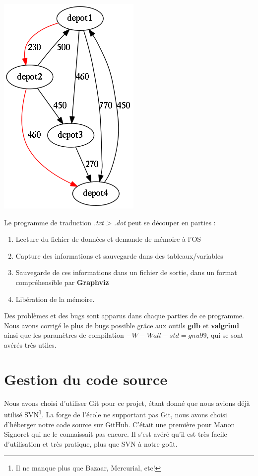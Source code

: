 \documentclass[12pt,a4paper]{report}
\begin{document}
\begin{center}
\includegraphics[scale=0.6]{output.png}
\end{center}

Le programme de traduction \textit{.txt > .dot} peut se découper en parties :


\begin{enumerate}
\item Lecture du fichier de données et demande de mémoire à l'OS 
\item Capture des informations et sauvegarde dans des tableaux/variables 
\item Sauvegarde de ces informations dans un fichier de sortie, dans un format compréhensible par \textbf{Graphviz}
\item Libération de la mémoire. 
\end{enumerate}

Des problèmes et des bugs sont apparus dans chaque parties de ce programme. Nous avons corrigé le plus de bugs possible grâce aux outils \textbf{gdb} et \textbf{valgrind} ainsi que les paramètres de compilation $-W -Wall -std=gnu99$, qui se sont avérés très utiles.

\section{Gestion du code source}
Nous avons choisi d'utiliser Git pour ce projet, \'{e}tant donn\'{e} que nous avions d\'{e}j\`{a} utilis\'{e} SVN\footnote{Il ne manque plus que Bazaar, Mercurial, etc!}. La forge de l'\'{e}cole ne supportant pas Git, nous avons choisi d'h\'{e}berger notre code source sur \href{https://github.com/Videl/Graph-Visualization-Manager}{GitHub}. C'était une première pour Manon Signoret qui ne le connaissait pas encore. Il s'est avéré qu'il est très facile d'utilisation et très pratique, plus que SVN à notre goût.
\end{document}
